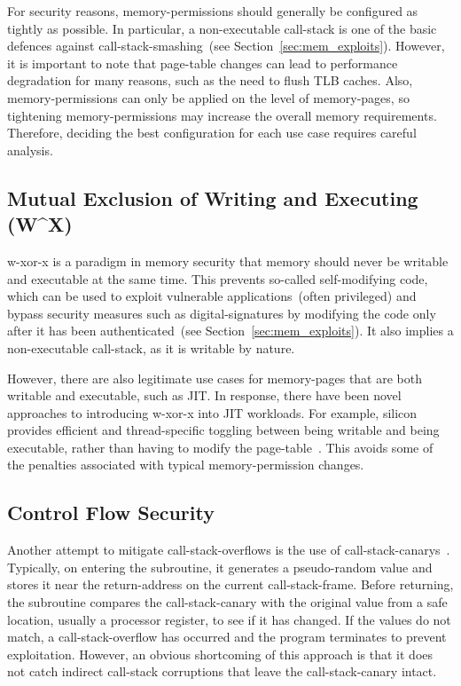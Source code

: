 For security reasons, \glspl{memory-permission} should generally be configured as tightly as possible. In particular, a non-executable \gls{call-stack} is one of the basic defences against \gls{call-stack-smashing}~(see Section~\ref{sec:mem_exploits}). However, it is important to note that \gls{page-table} changes can lead to performance degradation for many reasons, such as the need to flush \gls{TLB} caches. Also, \glspl{memory-permission} can only be applied on the level of \glspl{memory-page}, so tightening \glspl{memory-permission} may increase the overall memory requirements. Therefore, deciding the best configuration for each use case requires careful analysis.

\subsection{Mutual Exclusion of Writing and Executing (W\^{}X)}
\label{sec:mem_wxorx}

\Gls{w-xor-x} is a paradigm in memory security that memory should never be writable and executable at the same time. This prevents so-called self-modifying code, which can be used to exploit vulnerable applications~(often privileged) and bypass security measures such as \glspl{digital-signature} by modifying the code only after it has been authenticated~(see Section~\ref{sec:mem_exploits}). It also implies a non-executable \gls{call-stack}, as it is writable by nature.

However, there are also legitimate use cases for \glspl{memory-page} that are both writable and executable, such as \gls{JIT}. In response, there have been novel approaches to introducing \gls{w-xor-x} into \gls{JIT} workloads. For example,  silicon provides efficient and thread-specific toggling between being writable and being executable, rather than having to modify the \gls{page-table}~\cite{as-sec}. This avoids some of the penalties associated with typical \gls{memory-permission} changes.

\subsection{Control Flow Security}

Another attempt to mitigate \glspl{call-stack-overflow} is the use of \glspl{call-stack-canary}~\cite{10.1007/978-3-642-33338-5_5}. Typically, on entering the subroutine, it generates a pseudo-random value and stores it near the \gls{return-address} on the current \gls{call-stack-frame}. Before returning, the subroutine compares the \gls{call-stack-canary} with the original value from a safe location, usually a processor register, to see if it has changed. If the values do not match, a \gls{call-stack-overflow} has occurred and the program terminates to prevent exploitation. However, an obvious shortcoming of this approach is that it does not catch indirect \gls{call-stack} corruptions that leave the \gls{call-stack-canary} intact.

